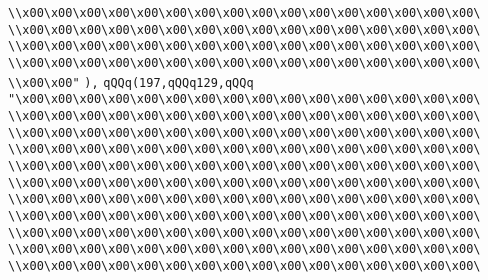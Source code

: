 \verb|\\x00\x00\x00\x00\x00\x00\x00\x00\x00\x00\x00\x00\x00\x00\x00\x00\|\newline
\verb|\\x00\x00\x00\x00\x00\x00\x00\x00\x00\x00\x00\x00\x00\x00\x00\x00\|\newline
\verb|\\x00\x00\x00\x00\x00\x00\x00\x00\x00\x00\x00\x00\x00\x00\x00\x00\|\newline
\verb|\\x00\x00\x00\x00\x00\x00\x00\x00\x00\x00\x00\x00\x00\x00\x00\x00\|\newline
\verb|\\x00\x00"|\newline
\verb|),|\newline
\verb|qQQq(197,qQQq129,qQQq|\newline
\verb|"\x00\x00\x00\x00\x00\x00\x00\x00\x00\x00\x00\x00\x00\x00\x00\x00\|\newline
\verb|\\x00\x00\x00\x00\x00\x00\x00\x00\x00\x00\x00\x00\x00\x00\x00\x00\|\newline
\verb|\\x00\x00\x00\x00\x00\x00\x00\x00\x00\x00\x00\x00\x00\x00\x00\x00\|\newline
\verb|\\x00\x00\x00\x00\x00\x00\x00\x00\x00\x00\x00\x00\x00\x00\x00\x00\|\newline
\verb|\\x00\x00\x00\x00\x00\x00\x00\x00\x00\x00\x00\x00\x00\x00\x00\x00\|\newline
\verb|\\x00\x00\x00\x00\x00\x00\x00\x00\x00\x00\x00\x00\x00\x00\x00\x00\|\newline
\verb|\\x00\x00\x00\x00\x00\x00\x00\x00\x00\x00\x00\x00\x00\x00\x00\x00\|\newline
\verb|\\x00\x00\x00\x00\x00\x00\x00\x00\x00\x00\x00\x00\x00\x00\x00\x00\|\newline
\verb|\\x00\x00\x00\x00\x00\x00\x00\x00\x00\x00\x00\x00\x00\x00\x00\x00\|\newline
\verb|\\x00\x00\x00\x00\x00\x00\x00\x00\x00\x00\x00\x00\x00\x00\x00\x00\|\newline
\verb|\\x00\x00\x00\x00\x00\x00\x00\x00\x00\x00\x00\x00\x00\x00\x00\x00\|\newline
